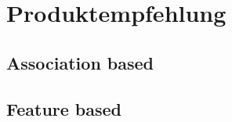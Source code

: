 \chapter{Produktempfehlung}

\section{Association based}
\lipsum[1-4]

\section{Feature based}
\lipsum[5-8]